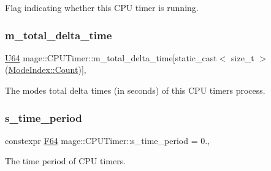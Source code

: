Flag indicating whether this C\+PU timer is running. \hypertarget{classmage_1_1_c_p_u_timer_a1c6d043eb08b1689d0f52dbd886fa9d4}{}\label{classmage_1_1_c_p_u_timer_a1c6d043eb08b1689d0f52dbd886fa9d4} 
\subsubsection{\texorpdfstring{m\+\_\+total\+\_\+delta\+\_\+time}{m\_total\_delta\_time}}
{\footnotesize\ttfamily \hyperlink{namespacemage_a6672cf3c861707ce4a3235a3eb43941d}{U64} mage\+::\+C\+P\+U\+Timer\+::m\+\_\+total\+\_\+delta\+\_\+time\mbox{[}static\+\_\+cast$<$ size\+\_\+t $>$(\hyperlink{classmage_1_1_c_p_u_timer_a98d59db3c396b14269c937e016c7625eae93f994f01c537c4e2f7d8528c3eb5e9}{Mode\+Index\+::\+Count})\mbox{]}\hspace{0.3cm}{\ttfamily [mutable]}, {\ttfamily [private]}}

The modes\textquotesingle{} total delta times (in seconds) of this C\+PU timer\textquotesingle{}s process. \hypertarget{classmage_1_1_c_p_u_timer_af7371eff8de8b5f667769ec71a69e9cf}{}\label{classmage_1_1_c_p_u_timer_af7371eff8de8b5f667769ec71a69e9cf} 
\subsubsection{\texorpdfstring{s\+\_\+time\+\_\+period}{s\_time\_period}}
{\footnotesize\ttfamily constexpr \hyperlink{namespacemage_ad26233bbec640deda836e572c1a23708}{F64} mage\+::\+C\+P\+U\+Timer\+::s\+\_\+time\+\_\+period = 0.\hspace{0.3cm}{\ttfamily [static]}, {\ttfamily [private]}}

The time period of C\+PU timers. 